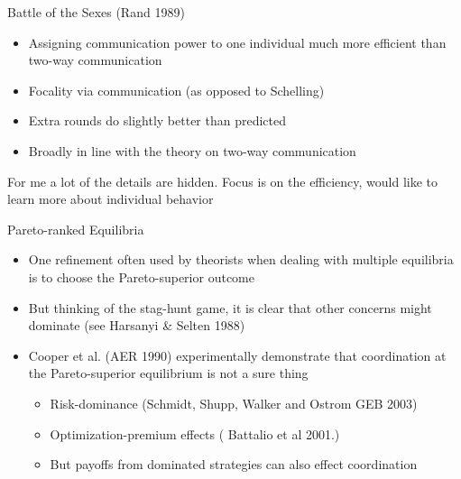 \documentclass{beamer}
\begin{document}
\begin{frame}{Battle of the Sexes (Rand 1989)}
	\begin{card}[Conclusions]
		\begin{itemize}
			\item Assigning communication power to one individual much more efficient than two-way communication
			\item Focality via communication (as opposed to Schelling)
			\item Extra rounds do slightly better than predicted
			\item Broadly in line with the theory on two-way communication
		\end{itemize}
		\end{card}
	\begin{card}
	 For me a lot of the details are hidden. Focus is on the efficiency, would like to learn more about individual behavior
	\end{card}
\end{frame}

\begin{frame}{Pareto-ranked Equilibria}
    \begin{card}
    	\begin{itemize}
    		\item One refinement often used by theorists when dealing with multiple equilibria is to choose the Pareto-superior outcome
    		\item But thinking of the stag-hunt game, it is clear that other concerns might dominate (see Harsanyi \& Selten 1988)
    		\item Cooper et al. (AER 1990) experimentally demonstrate that coordination at the Pareto-superior equilibrium is not a sure thing
    		\begin{itemize}
    			\item Risk-dominance (Schmidt, Shupp, Walker and Ostrom GEB 2003)
    			\item Optimization-premium effects ( Battalio et al 2001.) 
    			\item But payoffs from dominated strategies can also effect coordination
    		\end{itemize}
	\end{itemize}
	\end{card}
\end{frame}
\end{document}

